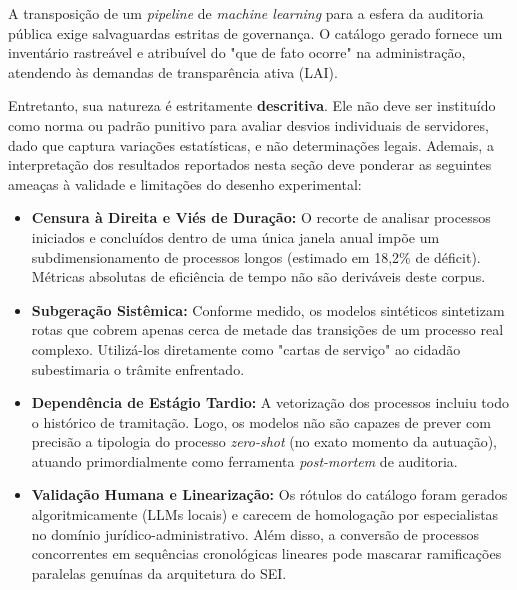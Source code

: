 A transposição de um \emph{pipeline} de \emph{machine learning} para a esfera da auditoria pública exige salvaguardas estritas de governança. O catálogo gerado fornece um inventário rastreável e atribuível do "que de fato ocorre" na administração, atendendo às demandas de transparência ativa (LAI). 

Entretanto, sua natureza é estritamente \textbf{descritiva}. Ele não deve ser instituído como norma ou padrão punitivo para avaliar desvios individuais de servidores, dado que captura variações estatísticas, e não determinações legais. Ademais, a interpretação dos resultados reportados nesta seção deve ponderar as seguintes ameaças à validade e limitações do desenho experimental:

\begin{itemize}
    \item \textbf{Censura à Direita e Viés de Duração:} O recorte de analisar processos iniciados e concluídos dentro de uma única janela anual impõe um subdimensionamento de processos longos (estimado em 18,2\% de déficit). Métricas absolutas de eficiência de tempo não são deriváveis deste corpus.
    \item \textbf{Subgeração Sistêmica:} Conforme medido, os modelos sintéticos sintetizam rotas que cobrem apenas cerca de metade das transições de um processo real complexo. Utilizá-los diretamente como "cartas de serviço" ao cidadão subestimaria o trâmite enfrentado.
    \item \textbf{Dependência de Estágio Tardio:} A vetorização dos processos incluiu todo o histórico de tramitação. Logo, os modelos não são capazes de prever com precisão a tipologia do processo \emph{zero-shot} (no exato momento da autuação), atuando primordialmente como ferramenta \emph{post-mortem} de auditoria.
    \item \textbf{Validação Humana e Linearização:} Os rótulos do catálogo foram gerados algoritmicamente (LLMs locais) e carecem de homologação por especialistas no domínio jurídico-administrativo. Além disso, a conversão de processos concorrentes em sequências cronológicas lineares pode mascarar ramificações paralelas genuínas da arquitetura do SEI.
\end{itemize}